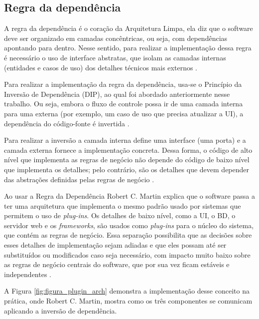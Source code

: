 \vspace{-1cm}
\subsection{Regra da dependência}

    \par A regra da dependência é o coração da Arquitetura Limpa, ela diz que o software deve ser organizado em camadas concêntricas, ou seja, com dependências apontando para dentro. Nesse sentido, para realizar a implementação dessa regra é necessário o uso de interface abstratas, que isolam as camadas internas (entidades e casos de uso) dos detalhes técnicos mais externos \cite{livro:martin:cleanarch}.

    \par Para realizar a implementação da regra da dependência, usa-se o Princípio da Inversão de Dependência (DIP), ao qual foi abordado anteriormente nesse trabalho. Ou seja, embora o fluxo de controle possa ir de uma camada interna para uma externa (por exemplo, um caso de uso que precisa atualizar a UI), a dependência do código-fonte é invertida \cite{livro:martin:cleanarch}.
    
    \par Para realizar a inversão  a camada interna define uma interface (uma porta) e a camada externa fornece a implementação concreta. Dessa forma, o código de alto nível que implementa as regras de negócio não depende do código de baixo nível que implementa os detalhes; pelo contrário, são os detalhes que devem depender das abstrações definidas pelas regras de negócio \cite{livro:martin:cleanarch}.
    
    \par Ao usar a Regra da Dependência Robert C. Martin explica que o software passa a ter uma arquitetura que implementa o mesmo padrão usado por sistemas que permitem o uso de \textit{plug-ins}. Os detalhes de baixo nível, como a UI, o BD, o servidor web e os \textit{frameworks}, são usados como \textit{plug-ins} para o núcleo do sistema, que contém as regras de negócio. Essa separação possibilita que as decisões sobre esses detalhes de implementação sejam adiadas e que eles possam até ser substituídos ou modificados caso seja necessário, com impacto muito baixo sobre as regras de negócio centrais do software, que por sua vez ficam estáveis e independentes \cite{livro:martin:cleanarch}.

    \par A Figura \ref{fig:figura_plugin_arch} demonstra a implementação desse conceito na prática, onde Robert C. Martin, mostra como os três componentes se comunicam aplicando a inversão de dependência. 

